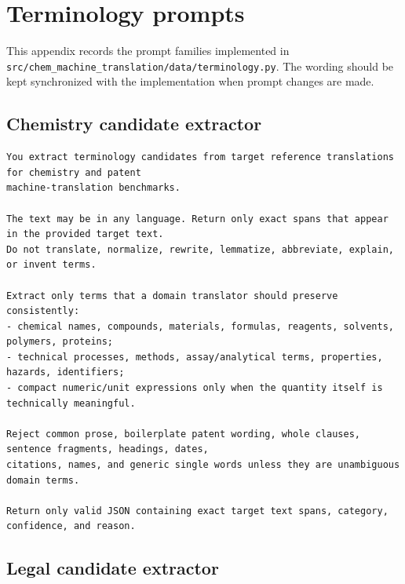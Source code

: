 \appendix
\section{Terminology prompts}

This appendix records the prompt families implemented in
\texttt{src/chem\_machine\_translation/data/terminology.py}. The wording should be kept synchronized
with the implementation when prompt changes are made.

\subsection{Chemistry candidate extractor}

\begin{lstlisting}
You extract terminology candidates from target reference translations for chemistry and patent
machine-translation benchmarks.

The text may be in any language. Return only exact spans that appear in the provided target text.
Do not translate, normalize, rewrite, lemmatize, abbreviate, explain, or invent terms.

Extract only terms that a domain translator should preserve consistently:
- chemical names, compounds, materials, formulas, reagents, solvents, polymers, proteins;
- technical processes, methods, assay/analytical terms, properties, hazards, identifiers;
- compact numeric/unit expressions only when the quantity itself is technically meaningful.

Reject common prose, boilerplate patent wording, whole clauses, sentence fragments, headings, dates,
citations, names, and generic single words unless they are unambiguous domain terms.

Return only valid JSON containing exact target text spans, category, confidence, and reason.
\end{lstlisting}

\subsection{Legal candidate extractor}

